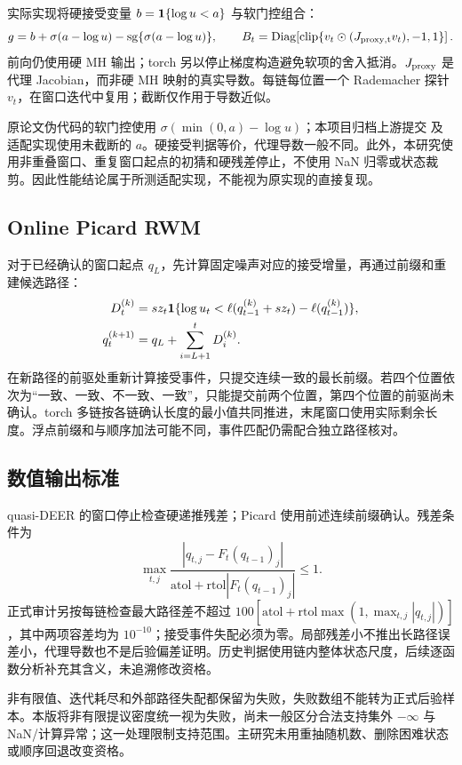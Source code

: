 实际实现将硬接受变量 $b=\mathbf 1\{\log u<a\}$ 与软门控组合：
\begin{equation}
g=b+\sigma(a-\log u)-\operatorname{sg}\{\sigma(a-\log u)\},\qquad
B_t=\operatorname{Diag}\!\left[\operatorname{clip}\{v_t\odot(J_{\rm proxy,t}v_t),-1,1\}\right].
\end{equation}
前向仍使用硬 MH 输出；torch 另以停止梯度构造避免软项的舍入抵消。$J_{\rm proxy}$ 是代理 Jacobian，而非硬 MH 映射的真实导数。每链每位置一个 Rademacher 探针 $v_t$，在窗口迭代中复用；截断仅作用于导数近似。

原论文伪代码的软门控使用 $\sigma(\min(0,a)-\log u)$；本项目归档上游提交  及适配实现使用未截断的 $a$。硬接受判据等价，代理导数一般不同。此外，本研究使用非重叠窗口、重复窗口起点的初猜和硬残差停止，不使用 NaN 归零或状态裁剪。因此性能结论属于所测适配实现，不能视为原实现的直接复现。

\subsection{Online Picard RWM}
对于已经确认的窗口起点 $q_L$，先计算固定噪声对应的接受增量，再通过前缀和重建候选路径\cite{grazzi}：
\begin{align}
D_t^{(k)}&=s z_t\mathbf 1\{\log u_t<\ell(q_{t-1}^{(k)}+s z_t)-\ell(q_{t-1}^{(k)})\},\\
q_t^{(k+1)}&=q_L+\sum_{i=L+1}^{t}D_i^{(k)}.
\end{align}
在新路径的前驱处重新计算接受事件，只提交连续一致的最长前缀。若四个位置依次为“一致、一致、不一致、一致”，只能提交前两个位置，第四个位置的前驱尚未确认。torch 多链按各链确认长度的最小值共同推进，末尾窗口使用实际剩余长度。浮点前缀和与顺序加法可能不同，事件匹配仍需配合独立路径核对。

\subsection{数值输出标准}
quasi-DEER 的窗口停止检查硬递推残差；Picard 使用前述连续前缀确认。残差条件为
\begin{equation}
\max_{t,j}\frac{|q_{t,j}-F_t(q_{t-1})_j|}
{\mathrm{atol}+\mathrm{rtol}|F_t(q_{t-1})_j|}\leq1.
\end{equation}
正式审计另按每链检查最大路径差不超过
$100[\mathrm{atol}+\mathrm{rtol}\max(1,\max_{t,j}|q_{t,j}|)]$，其中两项容差均为 $10^{-10}$；接受事件失配必须为零。局部残差小不推出长路径误差小，代理导数也不是后验偏差证明。历史判据使用链内整体状态尺度，后续逐函数分析补充其含义，未追溯修改资格。

非有限值、迭代耗尽和外部路径失配都保留为失败，失败数组不能转为正式后验样本。本版将非有限提议密度统一视为失败，尚未一般区分合法支持集外 $-\infty$ 与 NaN/计算异常；这一处理限制支持范围。主研究未用重抽随机数、删除困难状态或顺序回退改变资格。

